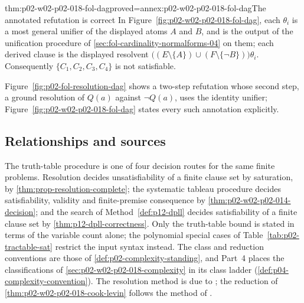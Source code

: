 \begin{hblemma}{thm:p02-w02-p02-018-fol-dag}{proved=annex:p02-w02-p02-018-fol-dag}{The annotated refutation is correct}
In Figure~\ref{fig:p02-w02-p02-018-fol-dag}, each \(\theta_i\) is a most
general unifier of the displayed atoms \(A\) and \(B\), and is the output of
the unification procedure of \cref{sec:fol-cardinality-normalforms-04} on
them; each derived clause is the displayed resolvent
\(\bigl((E\setminus\{A\})\cup(F\setminus\{\neg B\})\bigr)\theta_i\).
Consequently \(\{C_1,C_2,C_3,C_4\}\) is not satisfiable.
\end{hblemma}

Figure~\ref{fig:p02-fol-resolution-dag} shows a two-step refutation whose
second step, a ground resolution of \(Q(a)\) against \(\neg Q(a)\), uses the
identity unifier; Figure~\ref{fig:p02-w02-p02-018-fol-dag} states every such
annotation explicitly.

\subsection{Relationships and sources}
\label{sec:p02-w02-p02-018-relationships}

The truth-table procedure is one of four decision routes for the same finite
problems.  Resolution decides unsatisfiability of a finite clause set by
saturation, by \cref{thm:prop-resolution-complete}; the systematic tableau
procedure decides satisfiability, validity and finite-premise consequence by
\cref{thm:p02-w02-p02-014-decision}; and the search of
Method~\ref{def:p12-dpll} decides satisfiability of a finite clause set by
\cref{thm:p12-dpll-correctness}.  Only the truth-table bound is stated in
terms of the variable count alone; the polynomial special cases of
Table~\ref{tab:p02-tractable-sat} restrict the input syntax instead.  The
class and reduction conventions are those of
\cref{def:p02-complexity-standing}, and Part~4 places the classifications of
\cref{sec:p02-w02-p02-018-complexity} in its class ladder
(\cref{def:p04-complexity-convention}).  The resolution method is due to
\textcite{Robinson1965}; the reduction of
\cref{thm:p02-w02-p02-018-cook-levin} follows the method of
\textcite[p.~152, Theorem~1]{Cook1971}.
